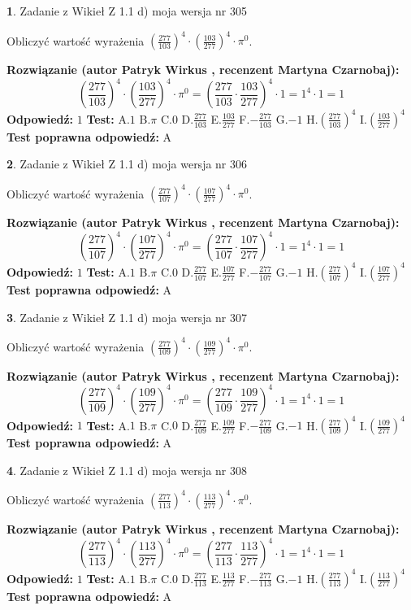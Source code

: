 \documentclass[12pt, a4paper]{article}
\theoremstyle{definition} %
\newtheorem{zad}{}
\newcommand{\zadStart}[1]{\begin{zad}#1\newline}
\newcommand{\zadStop}{\end{zad}}
\newcommand{\rozwStart}[2]{\noindent \textbf{Rozwiązanie (autor #1 , recenzent #2): }\newline}
\newcommand{\rozwStop}{\newline}
\newcommand{\odpStart}{\noindent \textbf{Odpowiedź:}\newline}
\newcommand{\odpStop}{\newline}
\newcommand{\testStart}{\noindent \textbf{Test:}\newline}
\newcommand{\testStop}{\newline}
\newcommand{\kluczStart}{\noindent \textbf{Test poprawna odpowiedź:}\newline}
\newcommand{\kluczStop}{\newline}
\begin{document}
\zadStart{Zadanie z Wikieł Z 1.1 d) moja wersja nr 305}

Obliczyć wartość wyrażenia $(\frac{277}{103})^{4} \cdot (\frac{103}{277})^{4} \cdot \pi^{0}$.
\zadStop
\rozwStart{Patryk Wirkus}{Martyna Czarnobaj}
$$(\frac{277}{103})^{4} \cdot (\frac{103}{277})^{4} \cdot \pi^{0} = (\frac{277}{103} \cdot \frac{103}{277})^{4} \cdot 1 = 1^{4} \cdot 1 = 1$$
\rozwStop
\odpStart
$1$
\odpStop
\testStart
A.$1$ B.$\pi$ C.$0$ D.$\frac{277}{103}$ E.$\frac{103}{277}$
F.$-\frac{277}{103}$ G.$-1$
H.$(\frac{277}{103})^{4}$
I.$(\frac{103}{277})^{4}$
\testStop
\kluczStart
A
\kluczStop



\zadStart{Zadanie z Wikieł Z 1.1 d) moja wersja nr 306}

Obliczyć wartość wyrażenia $(\frac{277}{107})^{4} \cdot (\frac{107}{277})^{4} \cdot \pi^{0}$.
\zadStop
\rozwStart{Patryk Wirkus}{Martyna Czarnobaj}
$$(\frac{277}{107})^{4} \cdot (\frac{107}{277})^{4} \cdot \pi^{0} = (\frac{277}{107} \cdot \frac{107}{277})^{4} \cdot 1 = 1^{4} \cdot 1 = 1$$
\rozwStop
\odpStart
$1$
\odpStop
\testStart
A.$1$ B.$\pi$ C.$0$ D.$\frac{277}{107}$ E.$\frac{107}{277}$
F.$-\frac{277}{107}$ G.$-1$
H.$(\frac{277}{107})^{4}$
I.$(\frac{107}{277})^{4}$
\testStop
\kluczStart
A
\kluczStop



\zadStart{Zadanie z Wikieł Z 1.1 d) moja wersja nr 307}

Obliczyć wartość wyrażenia $(\frac{277}{109})^{4} \cdot (\frac{109}{277})^{4} \cdot \pi^{0}$.
\zadStop
\rozwStart{Patryk Wirkus}{Martyna Czarnobaj}
$$(\frac{277}{109})^{4} \cdot (\frac{109}{277})^{4} \cdot \pi^{0} = (\frac{277}{109} \cdot \frac{109}{277})^{4} \cdot 1 = 1^{4} \cdot 1 = 1$$
\rozwStop
\odpStart
$1$
\odpStop
\testStart
A.$1$ B.$\pi$ C.$0$ D.$\frac{277}{109}$ E.$\frac{109}{277}$
F.$-\frac{277}{109}$ G.$-1$
H.$(\frac{277}{109})^{4}$
I.$(\frac{109}{277})^{4}$
\testStop
\kluczStart
A
\kluczStop



\zadStart{Zadanie z Wikieł Z 1.1 d) moja wersja nr 308}

Obliczyć wartość wyrażenia $(\frac{277}{113})^{4} \cdot (\frac{113}{277})^{4} \cdot \pi^{0}$.
\zadStop
\rozwStart{Patryk Wirkus}{Martyna Czarnobaj}
$$(\frac{277}{113})^{4} \cdot (\frac{113}{277})^{4} \cdot \pi^{0} = (\frac{277}{113} \cdot \frac{113}{277})^{4} \cdot 1 = 1^{4} \cdot 1 = 1$$
\rozwStop
\odpStart
$1$
\odpStop
\testStart
A.$1$ B.$\pi$ C.$0$ D.$\frac{277}{113}$ E.$\frac{113}{277}$
F.$-\frac{277}{113}$ G.$-1$
H.$(\frac{277}{113})^{4}$
I.$(\frac{113}{277})^{4}$
\testStop
\kluczStart
A
\kluczStop
\end{document}
